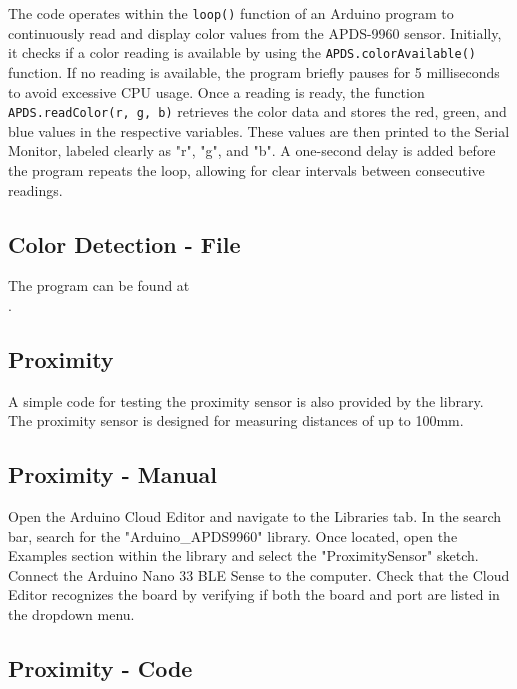 

The code operates within the \texttt{loop()} function of an Arduino program to continuously read and display color values from the APDS-9960 sensor. Initially, it checks if a color reading is available by using the \texttt{APDS.colorAvailable()} function. If no reading is available, the program briefly pauses for 5 milliseconds to avoid excessive CPU usage. Once a reading is ready, the function \texttt{APDS.readColor(r, g, b)} retrieves the color data and stores the red, green, and blue values in the respective variables. These values are then printed to the Serial Monitor, labeled clearly as "r", "g", and "b". A one-second delay is added before the program repeats the loop, allowing for clear intervals between consecutive readings.



\subsection{Color Detection - File}

The program can be found at \\
.

\subsection{Proximity}

A simple code for testing the proximity sensor is also provided by the library. The proximity sensor is designed for measuring distances of up to 100mm.

\subsection{Proximity - Manual}

Open the Arduino Cloud Editor and navigate to the Libraries tab. In the search bar, search for the "Arduino\_APDS9960" library. Once located, open the Examples section within the library and select the "ProximitySensor" sketch.
\smallskip
Connect the Arduino Nano 33 BLE Sense to the computer. Check that the Cloud Editor recognizes the board by verifying if both the board and port are listed in the dropdown menu.

\subsection{Proximity - Code}

